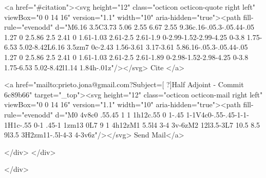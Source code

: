       <a  href="#citation"><svg height="12" class="octicon octicon-quote right left" viewBox="0 0 14 16" version="1.1" width="10" aria-hidden="true"><path fill-rule="evenodd" d="M6.16 3.5C3.73 5.06 2.55 6.67 2.55 9.36c.16-.05.3-.05.44-.05 1.27 0 2.5.86 2.5 2.41 0 1.61-1.03 2.61-2.5 2.61-1.9 0-2.99-1.52-2.99-4.25 0-3.8 1.75-6.53 5.02-8.42L6.16 3.5zm7 0c-2.43 1.56-3.61 3.17-3.61 5.86.16-.05.3-.05.44-.05 1.27 0 2.5.86 2.5 2.41 0 1.61-1.03 2.61-2.5 2.61-1.89 0-2.98-1.52-2.98-4.25 0-3.8 1.75-6.53 5.02-8.42l1.14 1.84h-.01z"/></svg> Cite
      </a>

      <a href="mailto:prieto.jona@gmail.com?Subject=[ ?]Half Adjoint - Commit 6c89b66" target="_top"><svg height="12" class="octicon octicon-mail right left" viewBox="0 0 14 16" version="1.1" width="10" aria-hidden="true"><path fill-rule="evenodd" d="M0 4v8c0 .55.45 1 1 1h12c.55 0 1-.45 1-1V4c0-.55-.45-1-1-1H1c-.55 0-1 .45-1 1zm13 0L7 9 1 4h12zM1 5.5l4 3-4 3v-6zM2 12l3.5-3L7 10.5 8.5 9l3.5 3H2zm11-.5l-4-3 4-3v6z"/></svg> Send Mail</a>

    </div>
  </div>

</div>




